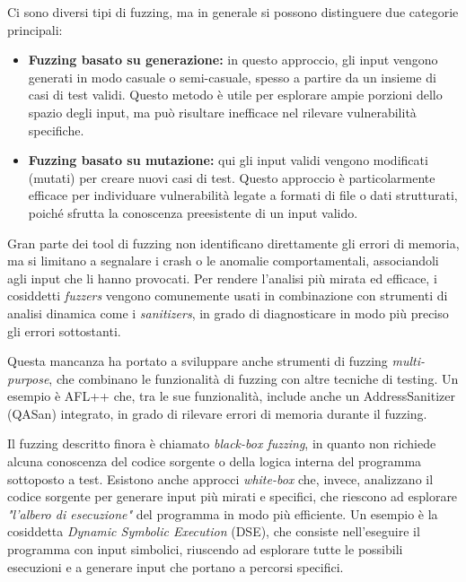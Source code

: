 \smallskip
Ci sono diversi tipi di fuzzing, ma in generale si possono distinguere due
categorie principali:

\begin{itemize}
  \item \textbf{Fuzzing basato su generazione:} in questo approccio, gli input vengono
    generati in modo casuale o semi-casuale, spesso a partire da un insieme di
    casi di test validi. Questo metodo è utile per esplorare ampie porzioni dello
    spazio degli input, ma può risultare inefficace nel rilevare vulnerabilità
    specifiche.

  \item \textbf{Fuzzing basato su mutazione:} qui gli input validi vengono
    modificati (mutati) per creare nuovi casi di test. Questo approccio è particolarmente
    efficace per individuare vulnerabilità legate a formati di file o dati strutturati,
    poiché sfrutta la conoscenza preesistente di un input valido.
\end{itemize}

Gran parte dei tool di fuzzing non identificano direttamente gli errori di memoria,
ma si limitano a segnalare i crash o le anomalie comportamentali, associandoli agli
input che li hanno provocati. Per rendere l'analisi più mirata ed efficace, i cosiddetti
\textit{fuzzers} vengono comunemente usati in combinazione con strumenti di
analisi dinamica come i \textit{sanitizers}, in grado di diagnosticare in modo
più preciso gli errori sottostanti.

Questa mancanza ha portato a sviluppare anche strumenti di fuzzing \textit{multi-purpose},
che combinano le funzionalità di fuzzing con altre tecniche di testing. Un esempio
è AFL++\cite{afl_plus_plus} che, tra le sue funzionalità, include anche un
AddressSanitizer (QASan\cite{qasan}) integrato, in grado di rilevare errori di
memoria durante il fuzzing.

Il fuzzing descritto finora è chiamato \textit{black-box fuzzing}, in quanto non
richiede alcuna conoscenza del codice sorgente o della logica interna del
programma sottoposto a test. Esistono anche approcci \textit{white-box} che, invece,
analizzano il codice sorgente per generare input più mirati e specifici, che riescono
ad esplorare \textit{"l'albero di esecuzione"} del programma in modo più
efficiente. Un esempio è la cosiddetta \textit{Dynamic Symbolic Execution} (DSE),
che consiste nell'eseguire il programma con input simbolici, riuscendo ad
esplorare tutte le possibili esecuzioni e a generare input che portano a
percorsi specifici.

